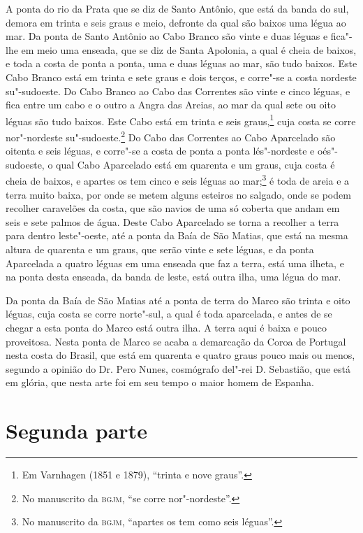 A ponta do rio da Prata que se diz de Santo Antônio, que está da banda do sul, demora em
trinta e seis graus e meio, defronte da qual são baixos uma légua ao mar. Da ponta de
Santo Antônio ao Cabo Branco são vinte e duas léguas e fica"-lhe em meio uma enseada, que
se diz de Santa Apolonia, a qual é cheia de baixos, e toda a costa de ponta a ponta, uma e
duas léguas ao mar, são tudo baixos. Este Cabo Branco está em trinta e sete graus e dois
terços, e corre"-se a costa nordeste su"-sudoeste. Do Cabo Branco ao Cabo das Correntes são
vinte e cinco léguas, e fica entre um cabo e o outro a Angra das Areias, ao mar da qual
sete ou oito léguas são tudo baixos. Este Cabo está em trinta e seis graus,\footnote{ Em
Varnhagen (1851 e 1879), ``trinta e nove graus''.} cuja costa se corre nor"-nordeste
su"-sudoeste.\footnote{ No manuscrito da \textsc{bgjm}, ``se corre nor"-nordeste''.} Do
Cabo das Correntes ao Cabo Aparcelado são oitenta e seis léguas, e corre"-se a costa de
ponta a ponta lés"-nordeste e oés"-sudoeste, o qual Cabo Aparcelado está em quarenta e um
graus, cuja costa é cheia de baixos, e apartes os tem cinco e seis léguas ao
mar;\footnote{ No manuscrito da \textsc{bgjm}, ``apartes os tem como seis léguas''.} é
toda de areia e a terra muito baixa, por onde se metem alguns esteiros no salgado, onde se
podem recolher caravelões da costa, que são navios de uma só coberta que andam em seis e
sete palmos de água. Deste Cabo Aparcelado se torna a recolher a terra para dentro
leste"-oeste, até a ponta da Baía de São Matias, que está na mesma altura de quarenta e um
graus, que serão vinte e sete léguas, e da ponta Aparcelada a quatro léguas em uma enseada
que faz a terra, está uma ilheta, e na ponta desta enseada, da banda de leste, está outra
ilha, uma légua do mar.

Da ponta da Baía de São Matias até a ponta de terra do Marco são trinta e oito léguas,
cuja costa se corre norte"-sul, a qual é toda aparcelada, e antes de se chegar a esta ponta
do Marco está outra ilha. A terra aqui é baixa e pouco proveitosa. Nesta ponta de Marco se
acaba a demarcação da Coroa de Portugal nesta costa do Brasil, que está em quarenta e
quatro graus pouco mais ou menos, segundo a opinião do Dr. Pero Nunes, cosmógrafo del"-rei
D. Sebastião, que está em glória, que nesta arte foi em seu tempo o maior homem de
Espanha.

\chapter[Segunda parte: Memorial e declaração]{Segunda parte }

